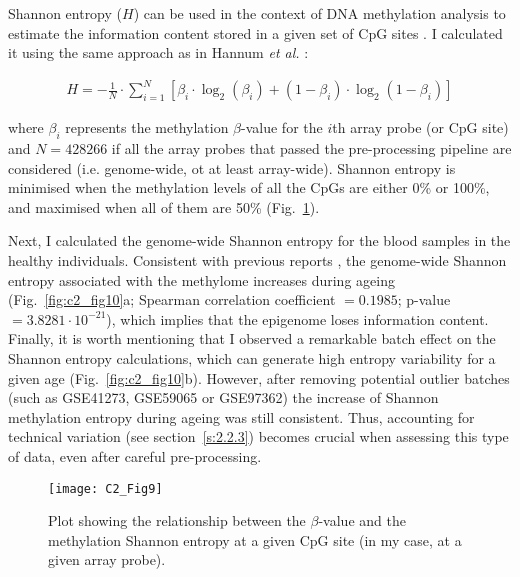 \smallskip

Shannon entropy ($H$) can be used in the context of DNA methylation analysis to estimate the information content stored in a given set of CpG sites \cite{Wang2017,Slieker2016,Hannum2013,Xie2011,Jenkinson2017}. I calculated it using the same approach as in Hannum \textit{et al.} \cite{Hannum2013}:

\begin{align}
H = - \frac{1}{N} \cdot \sum_{i=1}^{N}[\beta_i \cdot \log_2(\beta_i) + (1-\beta_i) \cdot \log_2(1-\beta_i)]
\end{align}

where $\beta_i$ represents the methylation $\beta$-value for the $i$th array probe (or CpG site) and $N=428266$ if all the array probes that passed the pre-processing pipeline are considered (i.e. genome-wide, ot at least array-wide). Shannon entropy is minimised when the methylation levels of all the CpGs are either 0\% or 100\%, and maximised when all of them are 50\% (Fig.~\ref{fig:c2_fig9}).

\bigskip

Next, I calculated the genome-wide  Shannon entropy for the blood samples in the healthy individuals. Consistent with previous reports \cite{Slieker2016,Hannum2013,Wang2017,Jenkinson2017},  the genome-wide Shannon entropy associated with the methylome increases during ageing (Fig.~\ref{fig:c2_fig10}a; Spearman correlation coefficient $= 0.1985$; p-value $= 3.8281 \cdot 10^{-21}$), which implies that the epigenome loses information content. Finally, it is worth mentioning that I observed a remarkable batch effect on the Shannon entropy calculations, which can generate high entropy variability for a given age (Fig.~\ref{fig:c2_fig10}b). However, after removing potential outlier batches (such as GSE41273, GSE59065 or GSE97362) the increase of Shannon methylation entropy during ageing was still consistent. Thus, accounting for technical variation (see section~\ref{s:2.2.3}) becomes crucial when assessing this type of data, even after careful pre-processing. 

\begin{figure}[htbp!] 
	\centering
	\vspace*{3mm}    
	\texttt{[image: C2\_Fig9]}
	\caption[Relationship between the $\beta$-value and the Shannon entropy at a given CpG site]{Plot showing the relationship between the $\beta$-value and the methylation Shannon entropy at a given CpG site (in my case, at a given array probe).}
	\label{fig:c2_fig9}
\end{figure}

